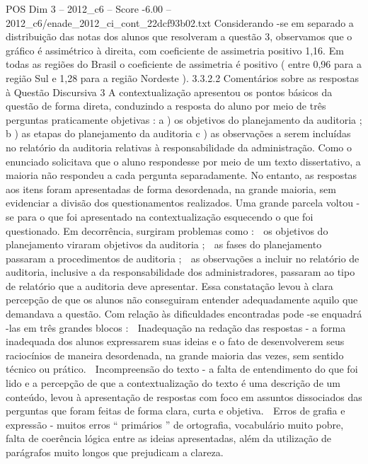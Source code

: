 \begin{textsample}{POS Dim 3 – 2012\_c6 – Score -6.00 – 2012\_c6/enade\_2012\_ci\_cont\_22dcf93b02.txt}
Considerando -se em separado a distribuição das notas dos alunos que resolveram a questão 3, observamos que o gráfico é assimétrico à direita, com coeficiente de assimetria positivo 1,16.
Em todas as regiões do Brasil o coeficiente de assimetria é positivo ( entre 0,96 para a região Sul e 1,28 para a região Nordeste ). 3.3.2.2 Comentários sobre as respostas à Questão Discursiva 3 A contextualização apresentou os pontos básicos da questão de forma direta, conduzindo a resposta do aluno por meio de três perguntas praticamente objetivas : a ) os objetivos do planejamento da auditoria ; b ) as etapas do planejamento da auditoria c ) as observações a serem incluídas no relatório da auditoria relativas à responsabilidade da administração.
Como o enunciado solicitava que o aluno respondesse por meio de um texto dissertativo, a maioria não respondeu a cada pergunta separadamente.
No entanto, as respostas aos itens foram apresentadas de forma desordenada, na grande maioria, sem evidenciar a divisão dos questionamentos realizados.
Uma grande parcela voltou -se para o que foi apresentado na contextualização esquecendo o que foi questionado.
Em decorrência, surgiram problemas como :  os objetivos do planejamento viraram objetivos da auditoria ;  as fases do planejamento passaram a procedimentos de auditoria ;  as observações a incluir no relatório de auditoria, inclusive a da responsabilidade dos administradores, passaram ao tipo de relatório que a auditoria deve apresentar.
Essa constatação levou à clara percepção de que os alunos não conseguiram entender adequadamente aquilo que demandava a questão.
Com relação às dificuldades encontradas pode -se enquadrá -las em três grandes blocos :  Inadequação na redação das respostas - a forma inadequada dos alunos expressarem suas ideias e o fato de desenvolverem seus raciocínios de maneira desordenada, na grande maioria das vezes, sem sentido técnico ou prático.  Incompreensão do texto - a falta de entendimento do que foi lido e a percepção de que a contextualização do texto é uma descrição de um conteúdo, levou à apresentação de respostas com foco em assuntos dissociados das perguntas que foram feitas de forma clara, curta e objetiva.  Erros de grafia e expressão - muitos erros “ primários ” de ortografia, vocabulário muito pobre, falta de coerência lógica entre as ideias apresentadas, além da utilização de parágrafos muito longos que prejudicam a clareza.

\end{textsample}
